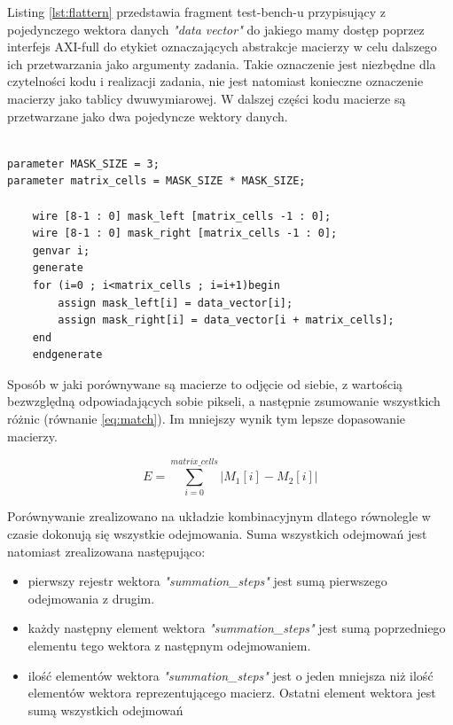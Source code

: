 Listing \ref{lst:flattern} przedstawia fragment test-bench-u przypisujący
z pojedynczego wektora danych \textit{"data vector"} do jakiego mamy dostęp poprzez
interfejs AXI-full do etykiet oznaczających abstrakcje macierzy w celu dalszego
ich przetwarzania jako argumenty zadania. Takie oznaczenie jest niezbędne dla
czytelności kodu i realizacji zadania, nie jest natomiast konieczne oznaczenie
macierzy jako tablicy dwuwymiarowej. W dalszej części kodu macierze są przetwarzane
jako dwa pojedyncze wektory danych.
   

\begin{lstlisting}[caption={fragment test bench w języku verilog przedstawiający
    sposób przypisania},label={lst:flattern}]

parameter MASK_SIZE = 3;
parameter matrix_cells = MASK_SIZE * MASK_SIZE;

    wire [8-1 : 0] mask_left [matrix_cells -1 : 0];
    wire [8-1 : 0] mask_right [matrix_cells -1 : 0];
    genvar i;
    generate
	for (i=0 ; i<matrix_cells ; i=i+1)begin
		assign mask_left[i] = data_vector[i];
		assign mask_right[i] = data_vector[i + matrix_cells];
	end
    endgenerate

\end{lstlisting}


Sposób w jaki porównywane są macierze to odjęcie od siebie, z wartością bezwzględną
odpowiadających sobie pikseli, a następnie zsumowanie wszystkich różnic
(równanie \ref{eq:match}).
Im mniejszy wynik tym lepsze dopasowanie macierzy.

\begin{equation}
E=\sum_{i=0}^{matrix\_cells}|M_{1}[i]-M_{2}[i] |
\label{eq:match}
\end{equation}

Porównywanie zrealizowano na układzie kombinacyjnym dlatego równolegle w czasie
dokonują się wszystkie odejmowania. Suma wszystkich odejmowań jest natomiast
zrealizowana następująco:

\begin{itemize}

\item pierwszy rejestr wektora \textit{"summation\_steps"} jest sumą pierwszego
odejmowania z drugim.

\item każdy następny element wektora \textit{"summation\_steps"} jest sumą poprzedniego
elementu tego wektora z następnym odejmowaniem.

\item ilość elementów wektora \textit{"summation\_steps"} jest o jeden mniejsza
niż ilość elementów wektora reprezentującego macierz. Ostatni element wektora
jest sumą wszystkich odejmowań

\end{itemize}

